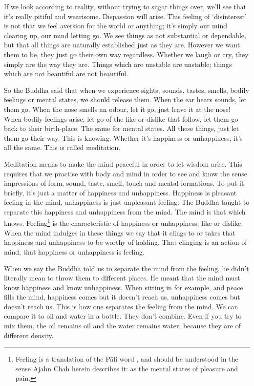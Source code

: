 If we look according to reality, without trying to sugar things over, we'll see that it's really pitiful and wearisome. Dispassion will arise. This feeling of `disinterest' is not that we feel aversion for the world or anything; it's simply our mind clearing up, our mind letting go. We see things as not substantial or dependable, but that all things are naturally established just as they are. However we want them to be, they just go their own way regardless. Whether we laugh or cry, they simply are the way they are. Things which are unstable are unstable; things which are not beautiful are not beautiful.

So the Buddha said that when we experience sights, sounds, tastes, smells, bodily feelings or mental states, we should release them. When the ear hears sounds, let them go. When the nose smells an odour, let it go, just leave it at the nose! When bodily feelings arise, let go of the like or dislike that follow, let them go back to their birth-place. The same for mental states. All these things, just let them go their way. This is knowing. Whether it's happiness or unhappiness, it's all the same. This is called meditation.

Meditation means to make the mind peaceful in order to let wisdom arise. This requires that we practise with body and mind in order to see and know the sense impressions of form, sound, taste, smell, touch and mental formations. To put it briefly, it's just a matter of happiness and unhappiness. Happiness is pleasant feeling in the mind, unhappiness is just unpleasant feeling. The Buddha taught to separate this happiness and unhappiness from the mind. The mind is that which knows. Feeling\footnote{Feeling is a translation of the P\=ali word , and should be understood in the sense Ajahn Chah herein describes it: as the mental states of pleasure and pain.} is the characteristic of happiness or unhappiness, like or dislike. When the mind indulges in these things we say that it clings to or takes that happiness and unhappiness to be worthy of holding. That clinging is an action of mind; that happiness or unhappiness is feeling.

When we say the Buddha told us to separate the mind from the feeling, he didn't literally mean to throw them to different places. He meant that the mind must know happiness and know unhappiness. When sitting in  for example, and peace fills the mind, happiness comes but it doesn't reach us, unhappiness comes but doesn't reach us. This is how one separates the feeling from the mind. We can compare it to oil and water in a bottle. They don't combine. Even if you try to mix them, the oil remains oil and the water remains water, because they are of different density.

